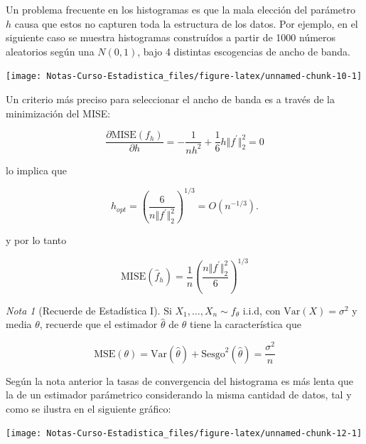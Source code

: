 \documentclass[
  12pt,
]{book}
\theoremstyle{definition}
\theoremstyle{definition}
\theoremstyle{definition}
\theoremstyle{definition}
\theoremstyle{remark}
\newtheorem*{remark}{Nota}
\begin{document}
Un problema frecuente en los histogramas es que la mala elección del parámetro \(h\) causa que estos no capturen toda la estructura de los datos. Por ejemplo, en el siguiente caso se muestra histogramas construídos a partir de 1000 números aleatorios según una \(N(0,1)\), bajo 4 distintas escogencias de ancho de banda.

\begin{center}\texttt{[image: Notas-Curso-Estadistica\_files/figure-latex/unnamed-chunk-10-1]} \end{center}

Un criterio más preciso para seleccionar el ancho de banda es a través de la minimización del MISE:

\begin{equation*}
\frac{\partial \mathrm{MISE}(f_{h})}{\partial h} = -\frac{1}{nh^2} + \frac{1}{6} h \Vert f^\prime\Vert_{2}^2 = 0
\end{equation*}

lo implica que

\begin{equation*}
h_{opt} = \left(\frac{6}{n\Vert f^\prime\Vert_{2}^2}\right) ^{1/3} = O\left( n^{-1/3} \right).
\end{equation*}

y por lo tanto

\begin{equation*}
\mathrm{MISE}(\hat{f}_{h}) = \frac{1}{n} \left(\frac{n\Vert f^\prime\Vert_{2}^2}{6}\right)  ^{1/3}
\end{equation*}

\begin{remark}[Recuerde de Estadística I]
Si \(X_1, \ldots, X_n \sim f_{\theta}\) i.i.d, con \(\mathrm{Var}(X) = \sigma^2\) y media \(\theta\), recuerde que el estimador \(\hat{\theta}\) de \(\theta\) tiene la característica que

\begin{equation*}
\mathrm{MSE}(\theta) = \mathrm{Var}(\hat{\theta}) +
\mathrm{Sesgo}^2(\hat{\theta}) = \frac{\sigma^2}{n}
\end{equation*}
\end{remark}

Según la nota anterior la tasas de convergencia del histograma es más lenta que la de un estimador parámetrico considerando la misma cantidad de datos, tal y como se ilustra en el siguiente gráfico:

\begin{center}\texttt{[image: Notas-Curso-Estadistica\_files/figure-latex/unnamed-chunk-12-1]} \end{center}
\end{document}
